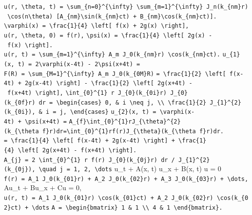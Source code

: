 \documentclass[
  ukrainian,
]{article}
\begin{document}
\texttt{u(r,\ \textbackslash{}theta,\ t)\ =\ \textbackslash{}sum\_\{n=0\}\^{}\{\textbackslash{}infty\}\ \textbackslash{}sum\_\{m=1\}\^{}\{\textbackslash{}infty\}\ J\_n(k\_\{nm\}r)\ \textbackslash{}cos(n\textbackslash{}theta)\ {[}A\_\{nm\}\textbackslash{}sin(k\_\{nm\}ct)\ +\ B\_\{nm\}\textbackslash{}cos(k\_\{nm\}ct){]}.}
\texttt{\textbackslash{}varphi(x)\ =\ \textbackslash{}frac\{1\}\{4\}\ \textbackslash{}left{[}\ f(x)\ +\ 2g(x)\ \textbackslash{}right{]},}
\texttt{u(r,\ \textbackslash{}theta,\ 0)\ =\ f(r),}
\texttt{\textbackslash{}psi(x)\ =\ \textbackslash{}frac\{1\}\{4\}\ \textbackslash{}left{[}\ 2g(x)\ -\ f(x)\ \textbackslash{}right{]}.}
\texttt{u(r,\ t)\ =\ \textbackslash{}sum\_\{m=1\}\^{}\{\textbackslash{}infty\}\ A\_m\ J\_0(k\_\{nm\}r)\ \textbackslash{}cos(k\_\{nm\}ct).}
\texttt{u\_\{1\}(x,\ t)\ =\ 2\textbackslash{}varphi(x-4t)\ -\ 2\textbackslash{}psi(x+4t)\ =}
\texttt{F(R)\ =\ \textbackslash{}sum\_\{M=1\}\^{}\{\textbackslash{}infty\}\ A\_m\ J\_0(k\_\{0M\}R)}
\texttt{=\ \textbackslash{}frac\{1\}\{2\}\ \textbackslash{}left{[}\ f(x-4t)\ +\ 2g(x-4t)\ \textbackslash{}right{]}\ -\ \textbackslash{}frac\{1\}\{2\}\ \textbackslash{}left{[}\ 2g(x+4t)\ -\ f(x+4t)\ \textbackslash{}right{]},}
\texttt{\textbackslash{}int\_\{0\}\^{}\{1\}\ r\ J\_\{0\}(k\_\{0i\}r)\ J\_\{0\}(k\_\{0f\}r)\ dr\ =\ \textbackslash{}begin\{cases\}\ 0,\ \&\ i\ \textbackslash{}neq\ j,\ \textbackslash{}\textbackslash{}\ \textbackslash{}frac\{1\}\{2\}\ J\_\{1\}\^{}\{2\}(k\_\{0i\}),\ \&\ i\ =\ j,\ \textbackslash{}end\{cases\}}
\texttt{u\_\{2\}(x,\ t)\ =\ \textbackslash{}varphi(x-4t)\ +\ \textbackslash{}psi(x+4t)\ =}
\texttt{A\_\{f\}\textbackslash{}int\_\{0\}\^{}\{1\}rJ\_\{\textbackslash{}theta\}\^{}\{2\}(k\_\{\textbackslash{}theta\ f\}r)dr=\textbackslash{}int\_\{0\}\^{}\{1\}rf(r)J\_\{\textbackslash{}theta\}(k\_\{\textbackslash{}theta\ f\}r)dr.}
\texttt{=\ \textbackslash{}frac\{1\}\{4\}\ \textbackslash{}left{[}\ f(x-4t)\ +\ 2g(x-4t)\ \textbackslash{}right{]}\ +\ \textbackslash{}frac\{1\}\{4\}\ \textbackslash{}left{[}\ 2g(x+4t)\ -\ f(x+4t)\ \textbackslash{}right{]}.}
\texttt{A\_\{j\}\ =\ 2\ \textbackslash{}int\_\{0\}\^{}\{1\}\ r\ f(r)\ J\_\{0\}(k\_\{0j\}r)\ dr\ /\ J\_\{1\}\^{}\{2\}(k\_\{0j\}),\ \textbackslash{}quad\ j\ =\ 1,\ 2,\ \textbackslash{}dots}
u\_t + A(x, t) u\_x + B(x, t) u = 0
\texttt{f(r)\ =\ A\_1\ J\_0(k\_\{01\}r)\ +\ A\_2\ J\_0(k\_\{02\}r)\ +\ A\_3\ J\_0(k\_\{03\}r)\ +\ \textbackslash{}dots,}
Au\_t + Bu\_x + Cu = 0,
\texttt{u(r,\ t)\ =\ A\_1\ J\_0(k\_\{01\}r)\ \textbackslash{}cos(k\_\{01\}ct)\ +\ A\_2\ J\_0(k\_\{02\}r)\ \textbackslash{}cos(k\_\{02\}ct)\ +\ \textbackslash{}dots}
\texttt{A\ =\ \textbackslash{}begin\{bmatrix\}\ 1\ \&\ 1\ \textbackslash{}\textbackslash{}\ 4\ \&\ 1\ \textbackslash{}end\{bmatrix\}.}
\end{document}

